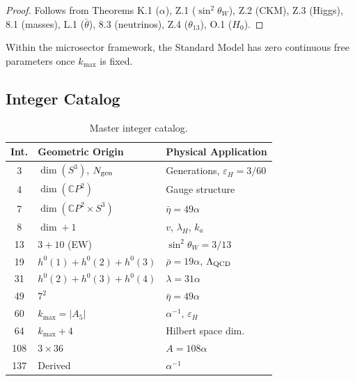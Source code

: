 \begin{proof}
Follows from Theorems K.1 ($\alpha$), Z.1 ($\sin^2\theta_W$), Z.2 (CKM), Z.3 (Higgs),
8.1 (masses), L.1 ($\bar{\theta}$), 8.3 (neutrinos), Z.4 ($\theta_{13}$), O.1 ($H_0$).
\end{proof}

\begin{corollary}
Within the microsector framework, the Standard Model has zero continuous free parameters once $k_{\max}$ is fixed.
\end{corollary}

\subsection{Integer Catalog}\label{app:integers}

\begin{table}[h]
\centering
\caption{Master integer catalog.}\label{tab:integers}
\scriptsize
\setlength{\tabcolsep}{2pt}
\renewcommand{\arraystretch}{1.1}
\begin{tabular}{cll}
\toprule
Int. & Geometric Origin & Physical Application \\
\midrule
3 & $\dim(S^3)$, $N_{\rm gen}$ & Generations, $\varepsilon_H = 3/60$ \\
4 & $\dim(\mathbb{C}P^2)$ & Gauge structure \\
7 & $\dim(\mathbb{C}P^2 \times S^3)$ & $\bar{\eta} = 49\alpha$ \\
8 & $\dim + 1$ & $v$, $\lambda_H$, $k_a$ \\
13 & $3 + 10$ (EW) & $\sin^2\theta_W = 3/13$ \\
19 & $h^0(1)\!+\!h^0(2)\!+\!h^0(3)$ & $\bar{\rho} = 19\alpha$, $\Lambda_{\rm QCD}$ \\
31 & $h^0(2)\!+\!h^0(3)\!+\!h^0(4)$ & $\lambda = 31\alpha$ \\
49 & $7^2$ & $\bar{\eta} = 49\alpha$ \\
60 & $k_{\max} = |A_5|$ & $\alpha^{-1}$, $\varepsilon_H$ \\
64 & $k_{\max} + 4$ & Hilbert space dim. \\
108 & $3 \times 36$ & $A = 108\alpha$ \\
137 & Derived & $\alpha^{-1}$ \\
\bottomrule
\end{tabular}
\end{table}

